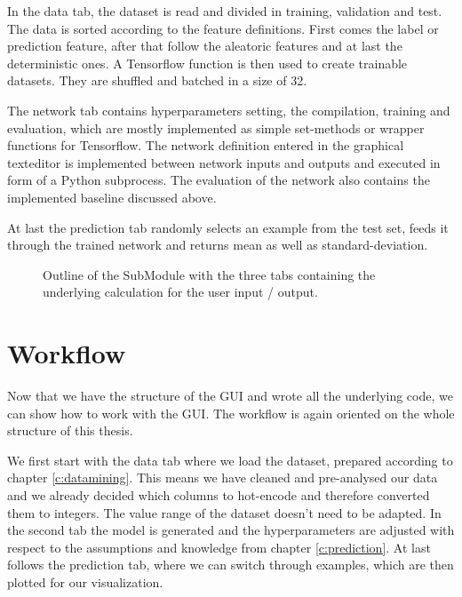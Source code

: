 		In the data tab, the dataset is read and divided in training, validation and test. The data is sorted according to the feature definitions. First comes the label or prediction feature, after that follow the aleatoric features and at last the deterministic ones. A Tensorflow function is then used to create trainable datasets. They are shuffled and batched in a size of 32.
		
		The network tab contains hyperparameters setting, the compilation, training and evaluation, which are mostly implemented as simple set-methods or wrapper functions for Tensorflow. The network definition entered in the graphical texteditor is implemented between network inputs and outputs and executed in form of a Python subprocess. \newline
		The evaluation of the network also contains the implemented baseline discussed above.
		
		At last the prediction tab randomly selects an example from the test set, feeds it through the trained network and returns mean as well as standard-deviation.

		\begin{figure}[htb]
		\centering
		
		\caption{Outline of the SubModule with the three tabs containing the underlying calculation for the user input / output.}
		\label{f:submodule_py}
		\end{figure}	
		
	\section{Workflow}
	Now that we have the structure of the GUI and wrote all the underlying code, we can show how to work with the GUI. The workflow is again oriented on the whole structure of this thesis.
	
	We first start with the data tab where we load the dataset, prepared according to chapter \ref{c:datamining}. This means we have cleaned and pre-analysed our data and we already decided which columns to hot-encode and therefore converted them to integers. The value range of the dataset doesn't need to be adapted. \newline
	In the second tab the model is generated and the hyperparameters are adjusted with respect to the assumptions and knowledge from chapter \ref{c:prediction}. \newline
	At last follows the prediction tab, where we can switch through examples, which are then plotted for our visualization.
	
